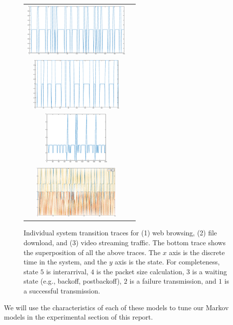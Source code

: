 \documentclass{llncs}
\begin{document}
\begin{figure}
\begin{tabular}{cc}
\includegraphics[width=\textwidth,height=100px]{../../src/results/browse_time.eps} \\
\includegraphics[width=\textwidth,height=100px]{../../src/results/file_time.eps} \\
\includegraphics[width=\textwidth,height=100px]{../../src/results/video_time.eps} \\
\includegraphics[width=\textwidth,height=100px]{../../src/results/all.eps} \\
\end{tabular}
\caption{Individual system transition traces for (1) web browsing, (2) file download, and (3) video streaming traffic. The bottom trace shows the superposition of all the above traces. The $x$ axis is the discrete time in the system, and the $y$ axis is the state. For completeness, state $5$ is interarrival, $4$ is the packet size calculation, $3$ is a waiting state (e.g., backoff, postbackoff), $2$ is a failure transmission, and $1$ is a successful transmission.}
\label{fig:traces}
\end{figure}

We will use the characteristics of each of these models to tune our Markov models in the experimental section of this report. 
\end{document}
